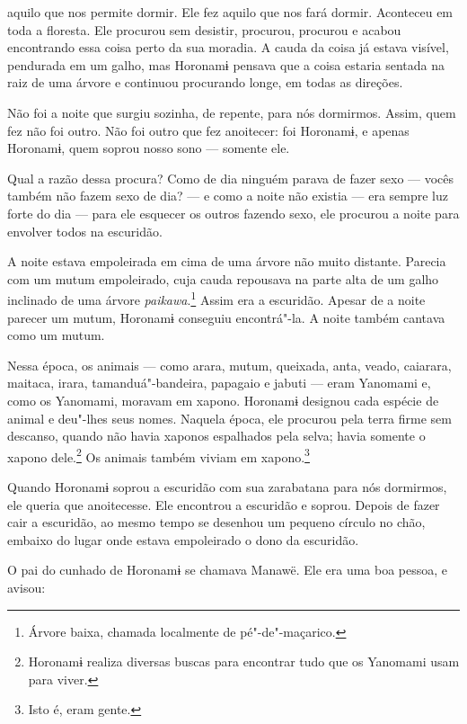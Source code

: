  

 

 aquilo que nos permite dormir. Ele fez aquilo que nos
fará dormir. Aconteceu em toda a floresta. Ele procurou sem desistir,
procurou, procurou e acabou encontrando essa coisa perto da sua moradia.
A cauda da coisa já estava visível, pendurada em um galho, mas Horonamɨ
pensava que a coisa estaria sentada na raiz de uma árvore e continuou
procurando longe, em todas as direções. 

Não foi a noite que surgiu sozinha, de repente, para nós dormirmos.
Assim, quem fez não foi outro. Não foi outro que fez anoitecer: foi
Horonamɨ, e apenas Horonamɨ, quem soprou nosso sono --- somente ele. 

Qual a razão dessa procura? Como de dia ninguém parava de fazer sexo ---
vocês também não fazem sexo de dia? --- e como a noite não existia ---
era sempre luz forte do dia --- para ele esquecer os outros fazendo
sexo, ele procurou a noite para envolver todos na escuridão. 

A noite estava empoleirada em cima de uma árvore não muito distante.
Parecia com um mutum empoleirado, cuja cauda repousava na parte alta de
um galho inclinado de uma árvore \emph{paikawa}.\footnote{  Árvore baixa, chamada localmente de pé"-de"-maçarico.}  Assim
era a escuridão. Apesar de a noite parecer um mutum, Horonamɨ conseguiu
encontrá"-la. A noite também cantava como um mutum. 

Nessa época, os animais --- como arara, mutum, queixada, anta, veado,
caiarara, maitaca, irara, tamanduá"-bandeira, papagaio e jabuti --- eram
Yanomami e, como os Yanomami, moravam em xapono. Horonamɨ designou cada
espécie de animal e deu"-lhes seus nomes. Naquela época, ele procurou
pela terra firme sem descanso, quando não havia xaponos espalhados pela
selva; havia somente o xapono dele.\footnote{  Horonamɨ realiza diversas buscas para encontrar tudo que os Yanomami
usam para viver.}  Os animais também
viviam em xapono.\footnote{  Isto é, eram gente.} 

Quando Horonamɨ soprou a escuridão com sua zarabatana para nós
dormirmos, ele queria que anoitecesse. Ele encontrou a escuridão e
soprou. Depois de fazer cair a escuridão, ao mesmo tempo se desenhou um
pequeno círculo no chão, embaixo do lugar onde estava empoleirado o dono
da escuridão.

O pai do cunhado de Horonamɨ se chamava Manawë. Ele era uma boa pessoa,
e avisou: 

